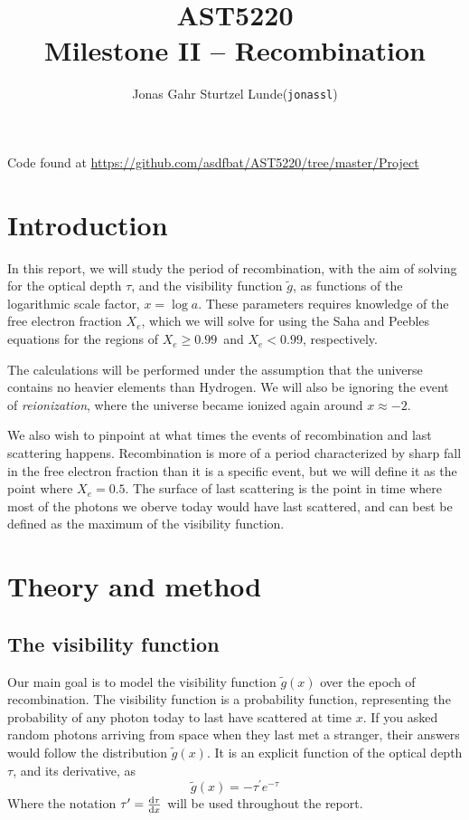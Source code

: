 \documentclass[10pt, a4paper]{article}
\begin{document}
\title{AST5220\\ Milestone II -- Recombination}
\author{
    \begin{tabular}{r l}
        Jonas Gahr Sturtzel Lunde & (\texttt{jonassl})
    \end{tabular}}

\maketitle
Code found at \url{https://github.com/asdfbat/AST5220/tree/master/Project}
\vspace{0.7cm}

\section{Introduction}
In this report, we will study the period of recombination, with the aim of solving for the optical depth $\tau$, and the visibility function $\tilde{g}$, as functions of the logarithmic scale factor, $x = \log{a}$. These parameters requires knowledge of the free electron fraction $X_e$, which we will solve for using the Saha and Peebles equations for the regions of $X_e \geq 0.99$ and $X_e < 0.99$, respectively.

The calculations will be performed under the assumption that the universe contains no heavier elements than Hydrogen. We will also be ignoring the event of \textit{reionization}, where the universe became ionized again around $x\approx -2$.

We also wish to pinpoint at what times the events of recombination and last scattering happens. Recombination is more of a period characterized by sharp fall in the free electron fraction than it is a specific event, but we will define it as the point where $X_e = 0.5$. The surface of last scattering is the point in time where most of the photons we oberve today would have last scattered, and can best be defined as the maximum of the visibility function.

\section{Theory and method}
\subsection{The visibility function}
Our main goal is to model the visibility function $\tilde{g}(x)$ over the epoch of recombination. The visibility function is a probability function, representing the probability of any photon today to last have scattered at time $x$. If you asked random photons arriving from space when they last met a stranger, their answers would follow the distribution $\tilde{g}(x)$. It is an explicit function of the optical depth $\tau$, and its derivative, as
\begin{equation}\label{eqn:g_tilde}
    \tilde{g}(x) = -\tau^{\prime} e^{-\tau}
\end{equation}
Where the notation $\tau^\prime = \dv{\tau}{x}$ will be used throughout the report.
\end{document}
